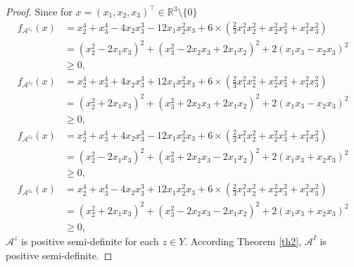 \documentclass[twoside]{article}
\begin{document}
\begin{proof}
Since for $x=(x_1,x_2,x_3)^{\top}\in\mathbb{R}^3\setminus\{0\}$
\begin{align*}
  f_{\mathcal{A}^{z_1}}(x) &=x_2^4+x_3^4-4x_2x_3^3-12x_1x_2^2x_3+6\times(\frac{2}{3}x_1^2x_2^2+x_2^2x_3^2+x_1^2x_3^2)\\
  &=(x_2^2-2x_1x_3)^2+(x_3^2-2x_2x_3+2x_1x_2)^2+2(x_1x_3-x_2x_3)^2\\
  &\geq0,
\end{align*}
\begin{align*}
  f_{\mathcal{A}^{z_2}}(x)&=x_2^4+x_3^4+4x_2x_3^3+12x_1x_2^2x_3+6\times(\frac{2}{3}x_1^2x_2^2+x_2^2x_3^2+x_1^2x_3^2)\\
  &=(x_2^2+2x_1x_3)^2+(x_3^2+2x_2x_3+2x_1x_2)^2+2(x_1x_3-x_2x_3)^2\\
  &\geq0,
\end{align*}
\begin{align*}
  f_{\mathcal{A}^{z_3}}(x)&=x_2^4+x_3^4+4x_2x_3^3-12x_1x_2^2x_3+6\times(\frac{2}{3}x_1^2x_2^2+x_2^2x_3^2+x_1^2x_3^2)\\
  &=(x_2^2-2x_1x_3)^2+(x_3^2+2x_2x_3-2x_1x_2)^2+2(x_1x_3+x_2x_3)^2\\
  &\geq0,
\end{align*}
\begin{align*}
 f_{\mathcal{A}^{z_4}}(x) &=x_2^4+x_3^4-4x_2x_3^3+12x_1x_2^2x_3+6\times(\frac{2}{3}x_1^2x_2^2+x_2^2x_3^2+x_1^2x_3^2)\\
  &=(x_2^2+2x_1x_3)^2+(x_3^2-2x_2x_3-2x_1x_2)^2+2(x_1x_3+x_2x_3)^2\\
  &\geq0,
\end{align*}
$\mathcal{A}^z$ is positive semi-definite for each $z\in Y$. According Theorem \ref{th2}, $\mathcal{A}^I$ is positive semi-definite.

\end{proof}
\end{document}
